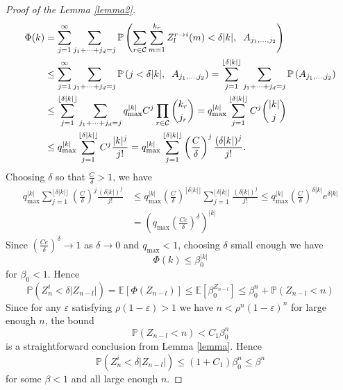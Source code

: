 \documentclass[12pt]{article}
\numberwithin{equation}{section}
\begin{document}
\begin{proof}[Proof of the Lemma \ref{lemma2}]
    \begin{align*}
        \Phi(k) &= \sum_{j = 1}^\infty \sum_{j_1 + \dots + j_d = j} \mathbb{P}\left(\sum_{r \in \mathcal{C}} \sum_{m=1}^{k_r} Z_l^{r \rightarrow i}(m)   < \delta |k|, \hspace{2mm} A_{j_1, \dots, j_2}\right) \\&\leq \sum_{j = 1}^\infty \sum_{j_1 + \dots + j_d = j} \mathbb{P}\left(j   < \delta |k|, \hspace{2mm} A_{j_1, \dots, j_2}\right) = \sum_{j = 1}^{\lfloor\delta|k|\rfloor} \sum_{j_1 + \dots + j_d = j} \mathbb{P}\left(A_{j_1, \dots, j_2}\right) 
        \\&\leq\sum_{j = 1}^{\lfloor\delta|k|\rfloor} \sum_{j_1 + \dots + j_d = j} q_{\max}^{|k|} C^{j} \prod_{r \in \mathcal{C}} \binom{k_r} {j_r}  = q_{\max}^{|k|}\sum_{j = 1}^{\lfloor\delta|k|\rfloor} C^{j}\binom{|k|} {j} \\&\leq q_{\max}^{|k|}\sum_{j = 1}^{\lfloor \delta|k|\rfloor} C^{j}\frac {|k|^j} {j !} = q_{\max}^{|k|}\sum_{j = 1}^{\lfloor \delta|k|\rfloor} \left(\frac {C}{\delta}\right)^{j}\frac {(\delta|k|)^j} {j !}.
    \end{align*}
    Choosing $\delta$ so that $\frac {C} \delta > 1$, we have
    \begin{align*}
        q_{\max}^{|k|}\sum_{j = 1}^{\lfloor \delta|k|\rfloor} \left(\frac {C}{\delta}\right)^{j}\frac {(\delta|k|)^j} {j !} &\leq q_{\max}^{|k|} \left(\frac {C}{\delta}\right)^{\lfloor \delta|k|\rfloor} \sum_{j = 1}^{\lfloor \delta|k|\rfloor} \frac {(\delta|k|)^j} {j !} \leq q_{\max}^{|k|} \left(\frac {C}{\delta}\right)^{\delta|k|} e^{\delta|k|} \\&= \left(q_{\max}\left( \frac {C e}{\delta}\right)^{\delta} \right)^{|k|} 
    \end{align*}
    Since $\left( \frac {C e}{\delta}\right)^{\delta} \rightarrow 1$ as $\delta \rightarrow 0$ and $q_{\max} < 1$, choosing $\delta$ small enough we have 
    \[\Phi(k) \leq \beta_0^{|k|}
    \]
    for $\beta_0 < 1$. Hence
    \[
    \mathbb{P}\left(Z_n^i < \delta |Z_{n-l}|\right) = \mathbb{E}[\Phi(Z_{n-l})] \leq \mathbb{E}[\beta_0^{Z_{n-l}}] \leq \beta_0^n + \mathbb{P}(Z_{n-l} < n)
    \]
    Since for any $\varepsilon$ satisfying $\rho(1-\varepsilon) > 1$ we have $n < \rho^n(1-\varepsilon)^n$ for large enough $n$, the bound 
    \[
    \mathbb{P}(Z_{n-l} < n) < C_1\beta_0^n
    \]
    is a straightforward conclusion from Lemma \ref{lemma}. Hence
    \[
    \mathbb{P}\left(Z_n^i < \delta |Z_{n-l}|\right) \leq (1+C_1)\beta_0^n \leq \beta^n 
    \]
    for some $\beta < 1$ and all large enough $n$.
        \end{proof}
\end{document}
